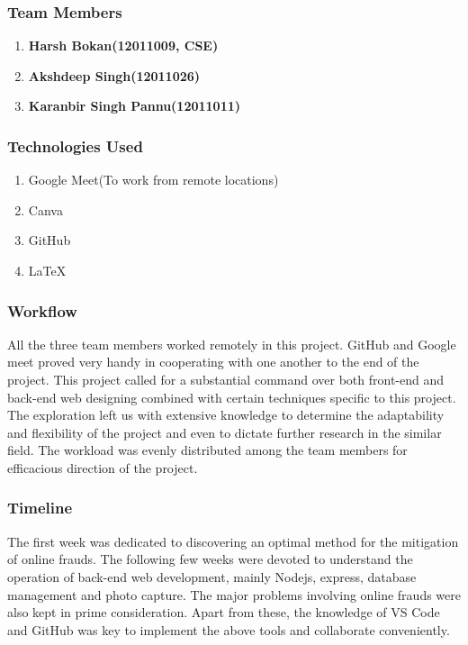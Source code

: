 \documentclass[12pt, oneside, a4paper]{article}
\begin{document}
\subsubsection{Team Members}
\begin{enumerate}
    \itemsep0em
    \item \textbf{Harsh Bokan(12011009, CSE)}
    \item \textbf{Akshdeep Singh(12011026)}
    \item \textbf{Karanbir Singh Pannu(12011011)}
\end{enumerate}

\subsubsection{Technologies Used}
\begin{enumerate}
    \itemsep0em
    \item Google Meet(To work from remote locations)
    \item Canva
    \item GitHub
    \item \LaTeX
\end{enumerate}

\subsubsection{Workflow}
All the three team members worked remotely in this project. GitHub and Google meet proved very handy in cooperating with one another to the end of the project. This project called for a substantial command over both front-end and back-end web designing combined with certain techniques specific to this project. The exploration left us with extensive knowledge to determine the adaptability and flexibility of the project and even to dictate further research in the similar field. The workload was evenly distributed among the team members for efficacious direction of the project.

\subsubsection{Timeline}
The first week was dedicated to discovering an optimal method for the mitigation of online frauds. The following few weeks were devoted to understand the operation of back-end web development, mainly Nodejs, express, database management and photo capture. The major problems involving online frauds were also kept in prime consideration. Apart from these, the knowledge of VS Code and GitHub was key to implement the above tools and collaborate conveniently.
\pagebreak
\end{document}
